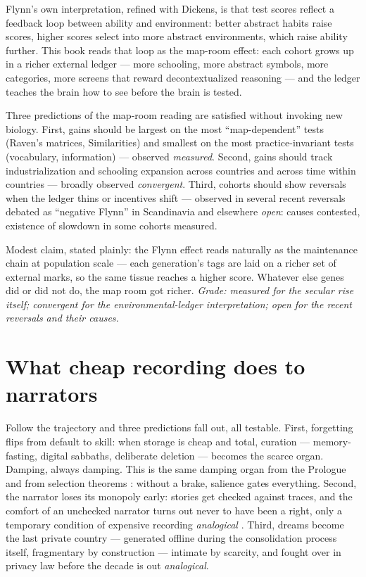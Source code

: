 Flynn's own interpretation, refined with Dickens, is that test scores reflect a feedback loop between ability and environment: better abstract habits raise scores, higher scores select into more abstract environments, which raise ability further. This book reads that loop as the map-room effect: each cohort grows up in a richer external ledger --- more schooling, more abstract symbols, more categories, more screens that reward decontextualized reasoning --- and the ledger teaches the brain how to see before the brain is tested.

Three predictions of the map-room reading are satisfied without invoking new biology. First, gains should be largest on the most ``map-dependent'' tests (Raven's matrices, Similarities) and smallest on the most practice-invariant tests (vocabulary, information) --- observed \textit{measured}. Second, gains should track industrialization and schooling expansion across countries and across time within countries --- broadly observed \textit{convergent}. Third, cohorts should show reversals when the ledger thins or incentives shift --- observed in several recent reversals debated as ``negative Flynn'' in Scandinavia and elsewhere \textit{open}: causes contested, existence of slowdown in some cohorts measured.

Modest claim, stated plainly: the Flynn effect reads naturally as the maintenance chain at population scale --- each generation's tags are laid on a richer set of external marks, so the same tissue reaches a higher score. Whatever else genes did or did not do, the map room got richer. \textit{Grade: measured for the secular rise itself; convergent for the environmental-ledger interpretation; open for the recent reversals and their causes.}

\section{What cheap recording does to narrators}

Follow the trajectory and three predictions fall out, all testable. First, forgetting flips from default to skill: when storage is cheap and total, curation --- memory-fasting, digital sabbaths, deliberate deletion --- becomes the scarce organ. Damping, always damping. This is the same damping organ from the Prologue and from selection theorems \citep{nayebi2026}: without a brake, salience gates everything. Second, the narrator loses its monopoly early: stories get checked against traces, and the comfort of an unchecked narrator turns out never to have been a right, only a temporary condition of expensive recording \textit{analogical} \citep{baars1988,clark2016,seth2021}. Third, dreams become the last private country --- generated offline during the consolidation process itself, fragmentary by construction --- intimate by scarcity, and fought over in privacy law before the decade is out \textit{analogical}.

